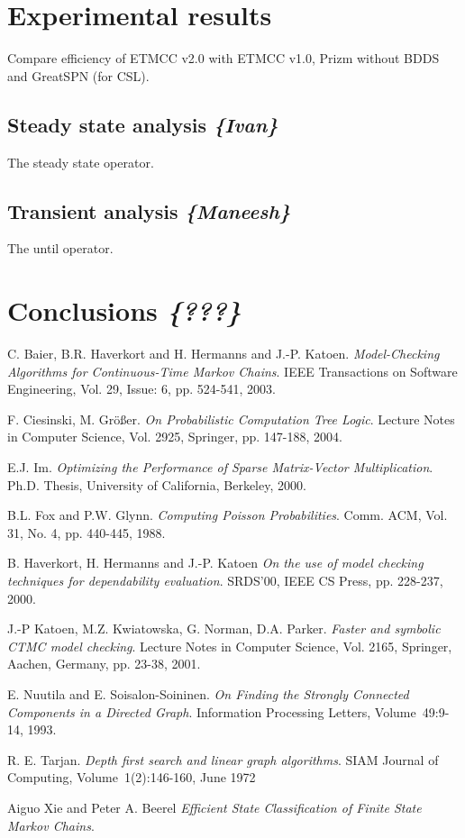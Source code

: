 \documentclass[a4paper,10pt]{article}
\begin{document}
\section{Experimental results }
	Compare efficiency of ETMCC v2.0 with ETMCC v1.0, Prizm without BDDS and GreatSPN (for CSL).

\subsection{Steady state analysis \textit{\{Ivan\}}}
	The steady state operator.

\subsection{Transient analysis \textit{\{Maneesh\}}}
	The until operator.

\section{Conclusions \textit{\{???\}}}

\begin{thebibliography}{5}

 C. Baier, B.R. Haverkort and H. Hermanns and J.-P. Katoen.
\newblock \emph{Model-Checking Algorithms for Continuous-Time Markov Chains}.
\newblock IEEE Transactions on Software Engineering, Vol. 29, Issue: 6, pp. 524-541, 2003.

 F. Ciesinski, M. Gr\"o\ss er.
\newblock \emph{On Probabilistic Computation Tree Logic}.
\newblock Lecture Notes in Computer Science, Vol. 2925, Springer, pp. 147-188, 2004.

 E.J. Im.
\newblock \emph{Optimizing the Performance of Sparse Matrix-Vector Multiplication}.
\newblock Ph.D. Thesis, University of California, Berkeley, 2000.
	
 B.L. Fox and P.W. Glynn.
\newblock \emph{Computing Poisson Probabilities}.
\newblock Comm. ACM, Vol. 31, No. 4, pp. 440-445, 1988.

 B. Haverkort, H. Hermanns and J.-P. Katoen
\newblock \emph{On the use of model checking techniques for dependability evaluation}.
\newblock SRDS'00, IEEE CS Press, pp. 228-237, 2000.

 J.-P Katoen, M.Z. Kwiatowska, G. Norman, D.A. Parker.
\newblock \emph{Faster and symbolic CTMC model checking}.
\newblock Lecture Notes in Computer Science, Vol. 2165, Springer, Aachen, Germany, pp. 23-38, 2001.
 
 E. Nuutila and E. Soisalon-Soininen.
\newblock \emph{On Finding the Strongly Connected Components in a Directed Graph}.
\newblock Information Processing Letters, Volume~49:9-14, 1993.

 R. E. Tarjan.
\newblock \emph{Depth first search and linear graph algorithms}.
\newblock SIAM Journal of Computing, Volume~1(2):146-160, June 1972

 Aiguo Xie and Peter A. Beerel
\newblock \emph{Efficient State Classification of Finite State Markov Chains}.

\end{thebibliography}
\end{document}
